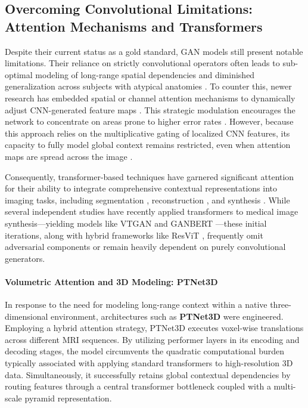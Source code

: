 \documentclass[11pt,a4paper]{article}
\begin{document}
\subsection{Overcoming Convolutional Limitations: Attention Mechanisms and Transformers}
Despite their current status as a gold standard, GAN models still present notable limitations. Their reliance on strictly convolutional operators often leads to sub-optimal modeling of long-range spatial dependencies and diminished generalization across subjects with atypical anatomies \cite{wang2018nonlocal, kodali2018}. To counter this, newer research has embedded spatial or channel attention mechanisms to dynamically adjust CNN-generated feature maps \cite{kearney2020, sagan, attention_unet, scgan, zhao2020, yuan2020, li2020}. This strategic modulation encourages the network to concentrate on areas prone to higher error rates \cite{sagan, attention_unet}. However, because this approach relies on the multiplicative gating of localized CNN features, its capacity to fully model global context remains restricted, even when attention maps are spread across the image \cite{xie2021, trans_unet, dai2021}.

Consequently, transformer-based techniques have garnered significant attention for their ability to integrate comprehensive contextual representations into imaging tasks, including segmentation \cite{trans_unet, xie2021, karimi2021}, reconstruction \cite{TransGAN, TransCT, SLATER}, and synthesis \cite{kamran2021, ganbert, ptnet3d}. While several independent studies have recently applied transformers to medical image synthesis---yielding models like VTGAN \cite{kamran2021} and GANBERT \cite{ganbert}---these initial iterations, along with hybrid frameworks like ResViT \cite{resvit}, frequently omit adversarial components or remain heavily dependent on purely convolutional generators.

\paragraph{Volumetric Attention and 3D Modeling: PTNet3D}
In response to the need for modeling long-range context within a native three-dimensional environment, architectures such as \textbf{PTNet3D} \cite{ptnet3d} were engineered. Employing a hybrid attention strategy, PTNet3D executes voxel-wise translations across different MRI sequences. By utilizing performer layers in its encoding and decoding stages, the model circumvents the quadratic computational burden typically associated with applying standard transformers to high-resolution 3D data. Simultaneously, it successfully retains global contextual dependencies by routing features through a central transformer bottleneck coupled with a multi-scale pyramid representation.
\end{document}
